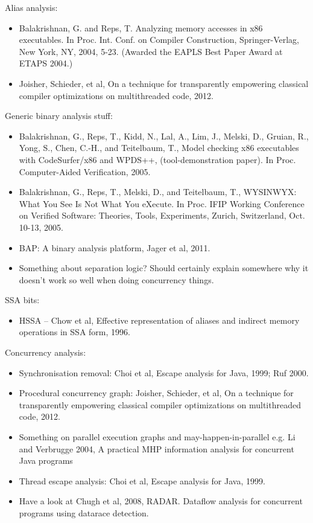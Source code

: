 


Alias analysis:

\begin{itemize}
\item
  Balakrishnan, G. and Reps, T. Analyzing memory accesses in x86 executables. In Proc. Int. Conf. on Compiler Construction, Springer-Verlag, New York, NY, 2004, 5-23. (Awarded the EAPLS Best Paper Award at ETAPS 2004.)
\item
  Joisher, Schieder, et al, On a technique for transparently empowering classical compiler optimizations on multithreaded code, 2012.
\end{itemize}

Generic binary analysis stuff:

\begin{itemize}
\item
  Balakrishnan, G., Reps, T., Kidd, N., Lal, A., Lim, J., Melski, D., Gruian, R., Yong, S., Chen, C.-H., and Teitelbaum, T., Model checking x86 executables with CodeSurfer/x86 and WPDS++, (tool-demonstration paper). In Proc. Computer-Aided Verification, 2005.
\item
  Balakrishnan, G., Reps, T., Melski, D., and Teitelbaum, T., WYSINWYX: What You See Is Not What You eXecute. In Proc. IFIP Working Conference on Verified Software: Theories, Tools, Experiments, Zurich, Switzerland, Oct. 10-13, 2005.
\item
  BAP: A binary analysis platform, Jager et al, 2011.
\item
  Something about separation logic?
  Should certainly explain somewhere why it doesn't work so well when doing concurrency things.
\end{itemize}

SSA bits:

\begin{itemize}
\item
  HSSA -- Chow et al, Effective representation of aliases and indirect memory operations in SSA form, 1996.
\end{itemize}

Concurrency analysis:

\begin{itemize}
\item
  Synchronisation removal: Choi et al, Escape analysis for Java, 1999; Ruf 2000.
\item
  Procedural concurrency graph: Joisher, Schieder, et al, On a technique for transparently empowering classical compiler optimizations on multithreaded code, 2012.
\item
  Something on parallel execution graphs and may-happen-in-parallel e.g. Li and Verbrugge 2004, A practical MHP information analysis for concurrent Java programs
\item
  Thread escape analysis: Choi et al, Escape analysis for Java, 1999.
\item
  Have a look at Chugh et al, 2008, RADAR.  Dataflow analysis for concurrent programs using datarace detection.
\end{itemize}

